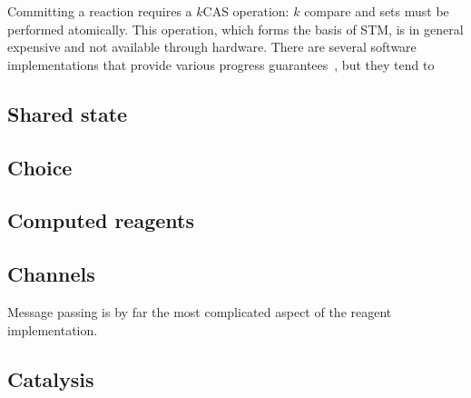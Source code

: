 \documentclass[preprint,nocopyrightspace]{sigplanconf}
\begin{document}
Committing a reaction requires a $k$CAS operation: $k$ compare and sets must
be performed atomically.  This operation, which forms the basis of STM, is in
general expensive and not available through hardware.  There are several
software implementations that provide various progress
guarantees~\cite{Fraser2007,Luchangco2003,Attiya2008}, but they tend to 

\subsection{Shared state}
\label{sec:impl-state}



\subsection{Choice}



\subsection{Computed reagents}



\subsection{Channels}

Message passing is by far the most complicated aspect of the reagent
implementation.

\subsection{Catalysis}


\end{document}

